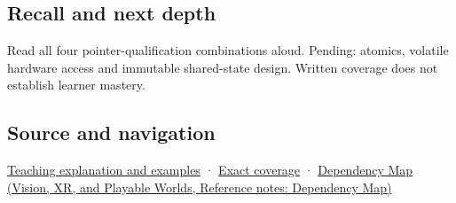 \subsection{Recall and next depth}\label{appendix-c25d60fed375-recall-and-next-depth}

Read all four pointer-qualification combinations aloud. Pending: atomics, volatile hardware access and immutable shared-state design. Written coverage does not establish learner mastery.

\subsection{Source and navigation}\label{appendix-c25d60fed375-source-and-navigation}

\hyperref[01-foundations-i-ch003-read-only-is-a-path-not-an-ownership-or-synchronization-promise]{Teaching explanation and examples} · \hyperref[appendix-fd090d982a15-m008---parts-113-126]{Exact coverage} · \href{../07-Vision-XR-and-Playable-Worlds/main.pdf\#nameddest=appendix-4ad47bdd269a}{Dependency Map (Vision, XR, and Playable Worlds, Reference notes: Dependency Map)}
